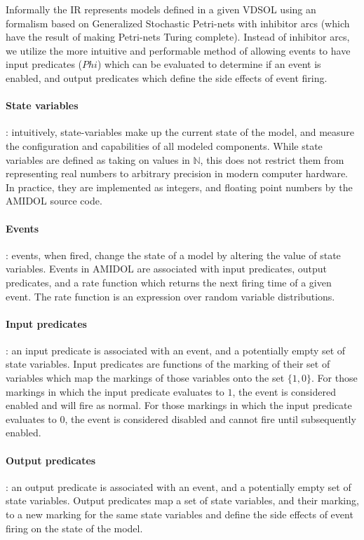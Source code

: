 \documentclass[11pt]{article}
\newcommand{\amidol}{\textsc{AMIDOL}}
\begin{document}
Informally the IR represents models defined in a given VDSOL using an formalism based on Generalized Stochastic Petri-nets with inhibitor arcs (which have the result of making Petri-nets Turing complete).  Instead of inhibitor arcs, we utilize the more intuitive and performable method of allowing events to have input predicates ($Phi$) which can be evaluated to determine if an event is enabled, and output predicates which define the side effects of event firing.

\paragraph{State variables}: intuitively, state-variables make up the current state of the model, and measure the configuration and capabilities of all modeled components.  While state variables are defined as taking on values in $\mathbb{N}$, this does not restrict them from representing real numbers to arbitrary precision in modern computer hardware.  In practice, they are implemented as integers, and floating point numbers by the \amidol{} source code.

\paragraph{Events}: events, when fired, change the state of a model by altering the value of state variables.  Events in \amidol{} are associated with input predicates, output predicates, and a rate function which returns the next firing time of a given event.  The rate function is an expression over random variable distributions.

\paragraph{Input predicates}: an input predicate is associated with an event, and a potentially empty set of state variables.  Input predicates are functions of the marking of their set of variables which map the markings of those variables onto the set $\{1, 0\}$.  For those markings in which the input predicate evaluates to $1$, the event is considered enabled and will fire as normal.  For those markings in which the input predicate evaluates to $0$, the event is considered disabled and cannot fire until subsequently enabled.

\paragraph{Output predicates}: an output predicate is associated with an event, and a potentially empty set of state variables.  Output predicates map a set of state variables, and their marking, to a new marking for the same state variables and define the side effects of event firing on the state of the model.
\end{document}
